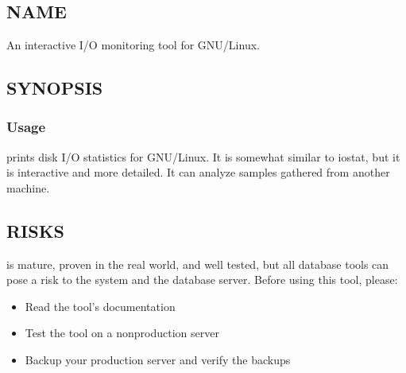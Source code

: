 \documentclass[letterpaper,10pt,english]{sphinxmanual}
\begin{document}
\chapter{}
\label{\detokenize{mariadb-iostat:mariadb-iostat}}\label{\detokenize{mariadb-iostat::doc}}

\section{NAME}
\label{\detokenize{mariadb-iostat:name}}
\sphinxAtStartPar
{} \sphinxhyphen{} An interactive I/O monitoring tool for GNU/Linux.


\section{SYNOPSIS}
\label{\detokenize{mariadb-iostat:synopsis}}

\subsection{Usage}
\label{\detokenize{mariadb-iostat:usage}}
\begin{sphinxVerbatim}[commandchars=\\\{\}]
 \PYG{p}{[}\PYG{p}{]} \PYG{p}{[}\PYG{p}{]}
\end{sphinxVerbatim}

\sphinxAtStartPar
{} prints disk I/O statistics for GNU/Linux.  It is somewhat similar
to iostat, but it is interactive and more detailed.  It can analyze samples
gathered from another machine.


\section{RISKS}
\label{\detokenize{mariadb-iostat:risks}}
\sphinxAtStartPar
{} is mature, proven in the real world, and well tested,
but all database tools can pose a risk to the system and the database
server.  Before using this tool, please:
\begin{itemize}
\item {} 
\sphinxAtStartPar
Read the tool’s documentation

\item {} 
\sphinxAtStartPar
Test the tool on a non\sphinxhyphen{}production server

\item {} 
\sphinxAtStartPar
Backup your production server and verify the backups

\end{itemize}
\end{document}
